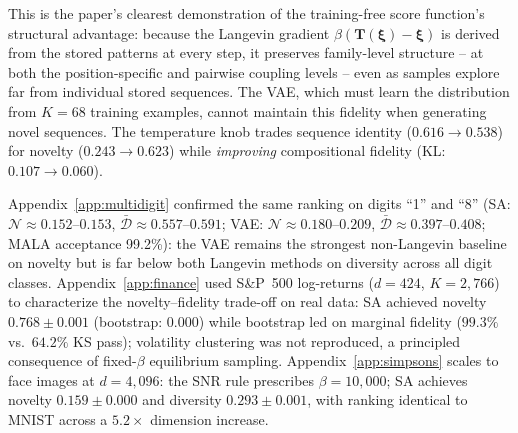 This is the paper's clearest demonstration of the training-free score function's structural advantage: because the Langevin gradient $\beta(\mathbf{T}(\boldsymbol{\xi})-\boldsymbol{\xi})$ is derived from the stored patterns at every step, it preserves family-level structure -- at both the position-specific and pairwise coupling levels -- even as samples explore far from individual stored sequences. The VAE, which must learn the distribution from $K{=}68$ training examples, cannot maintain this fidelity when generating novel sequences. The temperature knob trades sequence identity ($0.616\to 0.538$) for novelty ($0.243\to 0.623$) while \emph{improving} compositional fidelity (KL: $0.107\to 0.060$).

Appendix~\ref{app:multidigit} confirmed the same ranking on digits ``1'' and ``8'' (SA: $\mathcal{N}{\approx}0.152$--$0.153$, $\bar{\mathcal{D}}{\approx}0.557$--$0.591$; VAE: $\mathcal{N}{\approx}0.180$--$0.209$, $\bar{\mathcal{D}}{\approx}0.397$--$0.408$; MALA acceptance 99.2\%): the VAE remains the strongest non-Langevin baseline on novelty but is far below both Langevin methods on diversity across all digit classes. Appendix~\ref{app:finance} used S\&P~500 log-returns ($d{=}424$, $K{=}2{,}766$) to characterize the novelty--fidelity trade-off on real data: SA achieved novelty $0.768\pm0.001$ (bootstrap: $0.000$) while bootstrap led on marginal fidelity ($99.3\%$ vs.\ $64.2\%$ KS pass); volatility clustering was not reproduced, a principled consequence of fixed-$\beta$ equilibrium sampling. Appendix~\ref{app:simpsons} scales to face images at $d{=}4{,}096$: the SNR rule prescribes $\beta{=}10{,}000$; SA achieves novelty $0.159\pm0.000$ and diversity $0.293\pm0.001$, with ranking identical to MNIST across a $5.2{\times}$ dimension increase.